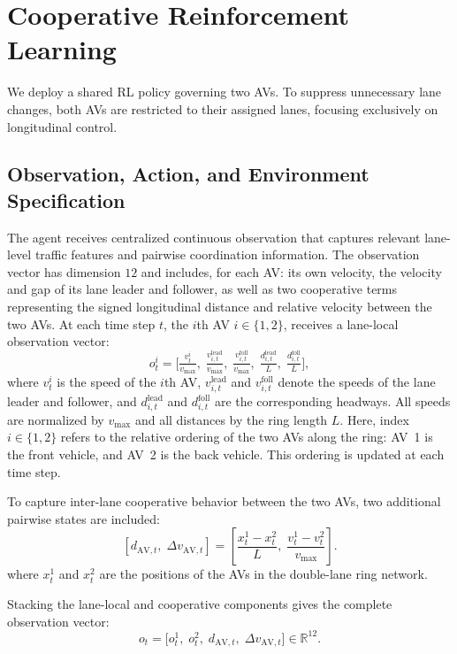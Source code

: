 \documentclass{ifacconf}
\begin{document}
\section{Cooperative Reinforcement Learning}
\label{sec:Cooperative}
We deploy a shared RL policy governing two AVs. To suppress unnecessary lane changes, both AVs are restricted to their assigned lanes, focusing exclusively on longitudinal control.

\subsection{Observation, Action, and Environment Specification}
The agent receives centralized continuous observation that captures relevant lane-level traffic features and pairwise coordination information. The observation vector has dimension $12$ and includes, for each AV: its own velocity, the velocity and gap of its lane leader and follower, as well as two cooperative terms representing the signed longitudinal distance and relative velocity between the two AVs. 
At each time step $t$, the $i$th AV $i \in \{1,2\}$, receives a lane-local observation vector:
\begin{equation*}
o^{i}_{t} =
\Big[
    \tfrac{v_t^i}{v_{\max}},\;
    \tfrac{v^{\mathrm{lead}}_{i,t}}{v_{\max}},\;
    \tfrac{v^{\mathrm{foll}}_{i,t}}{v_{\max}},\;
    \tfrac{d^{\mathrm{lead}}_{i,t}}{L},\;
    \tfrac{d^{\mathrm{foll}}_{i,t}}{L}
\Big],
\end{equation*}
where $v_t^i$ is the speed of the $i$th AV, 
$v^{\mathrm{lead}}_{i,t}$ and $v^{\mathrm{foll}}_{i,t}$ denote the speeds of the lane leader and follower,
and $d^{\mathrm{lead}}_{i,t}$ and $d^{\mathrm{foll}}_{i,t}$ are the corresponding headways.  
All speeds are normalized by $v_{\max}$ and all distances by the ring length $L$. Here, index $i \in \{1,2\}$ refers to the relative ordering of the two AVs
along the ring: AV~1 is the front vehicle, and AV~2 is the back 
vehicle. This ordering is updated at each time step.

To capture inter-lane cooperative behavior between the two AVs, two additional pairwise states are included:
\begin{equation*}
\left[
d_{\mathrm{AV},t},\;
\Delta v_{\mathrm{AV},t}
\right]
=
\left[
\frac{x_t^1 - x_t^2}{L},\;
\frac{v_t^1 - v_t^2}{v_{\max}}
\right].
\end{equation*}
where $x_t^1$ and $x_t^2$ are the positions of the AVs in the double-lane ring network.

Stacking the lane-local and cooperative components gives the complete observation vector:
\begin{equation*}
o_t = 
\big[
    o^{1}_t,\;
    o^{2}_t,\;
    d_{\mathrm{AV},t},\;
    \Delta v_{\mathrm{AV},t}
\big]
\in \mathbb{R}^{12}.
\end{equation*}
\end{document}
